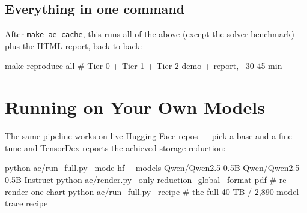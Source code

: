 \documentclass[11pt]{article}
\newcommand{\code}[1]{\texttt{#1}}
\begin{document}
\subsection{Everything in one command}

After \code{make ae-cache}, this runs all of the above (except the solver
benchmark) plus the HTML report, back to back:

\begin{shell}
make reproduce-all       # Tier 0 + Tier 1 + Tier 2 demo + report, ~30-45 min
\end{shell}

\section{Running on Your Own Models}

The same pipeline works on live Hugging Face repos --- pick a base and a
fine-tune and TensorDex reports the achieved storage reduction:

\begin{shell}
python ae/run_full.py --mode hf \
    --models Qwen/Qwen2.5-0.5B Qwen/Qwen2.5-0.5B-Instruct
python ae/render.py --only reduction_global --format pdf   # re-render one chart
python ae/run_full.py --recipe   # the full 40 TB / 2,890-model trace recipe
\end{shell}
\end{document}
